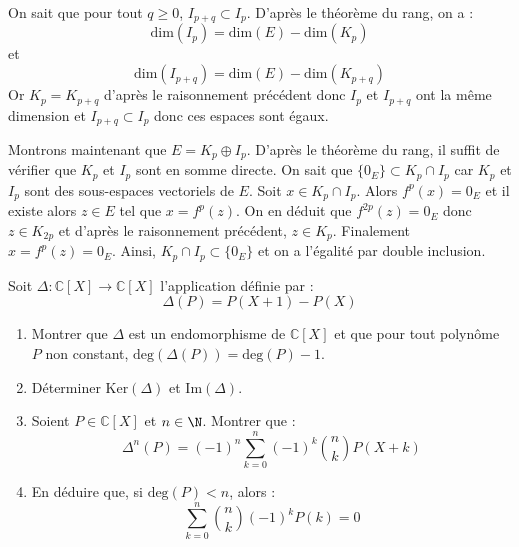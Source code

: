 \documentclass[a4paper,10pt]{report}
\begin{document}
\begin{enumerate}
\medskip

\noindent On sait que pour tout $q \geq 0$, $I_{p+q} \subset I_{p}$. D'après le théorème du rang, on a :
$$ \textrm{dim}(I_p) = \textrm{dim}(E) - \textrm{dim}(K_p)$$
et 
$$ \textrm{dim}(I_{p+q}) = \textrm{dim}(E) - \textrm{dim}(K_{p+q})$$
Or $K_p = K_{p+q}$ d'après le raisonnement précédent donc $I_p$ et $I_{p+q}$ ont la même dimension et $I_{p+q} \subset I_{p}$ donc ces espaces sont égaux.

\medskip

\noindent Montrons maintenant que $E = K_p \oplus I_p$. D'après le théorème du rang, il suffit de vérifier que $K_p$ et $I_p$ sont en somme directe. On sait que $\lbrace 0_E \rbrace \subset  K_p \cap I_p$ car $K_p$ et $I_p$ sont des sous-espaces vectoriels de $E$. Soit $x \in  K_p \cap I_p$. Alors $f^p(x)=0_E$ et il existe alors $z \in E$ tel que $x=f^p(z)$. On en déduit que $f^{2p}(z)=0_E$ donc $z \in K_{2p}$ et d'après le raisonnement précédent, $z \in K_p$. Finalement $x=f^p(z)=0_E$. Ainsi, $K_p \cap I_p \subset \lbrace 0_E \rbrace $ et on a l'égalité par double inclusion.    

\end{enumerate}

\medskip


\begin{Exercice}{} Soit $\Delta : \mathbb{C}[X] \rightarrow \mathbb{C}[X]$ l'application définie par :
  \[
  \Delta (P ) = P( X + 1 ) - P(X )
  \]
  \begin{enumerate}
  \item
    Montrer que $\Delta$ est un endomorphisme de $\mathbb{C}[X]$ et que pour tout polynôme $P$ non constant, $\textrm{deg} ( \Delta(P)) = \textrm{deg}(P) - 1$.
  \item
    Déterminer $\textrm{Ker}(\Delta)$ et $\textrm{Im}(\Delta)$.
  \item Soient $P \in \mathbb{C}[X]$ et $n \in \N$. Montrer que :
    \[
    \Delta^{n}(P) = ( - 1)^{n} \sum_{k = 0}^{n} ( - 1)^{k} \binom{n}{k}P(X + k)
    \]
  \item En déduire que, si $\textrm{deg}(P) < n$, alors :
    \[
    \sum_{k = 0}^{n} \binom{n}{k}( - 1)^{k} P(k) = 0 
    \]
  \end{enumerate}
\end{Exercice} 

\corr 
\end{document}
